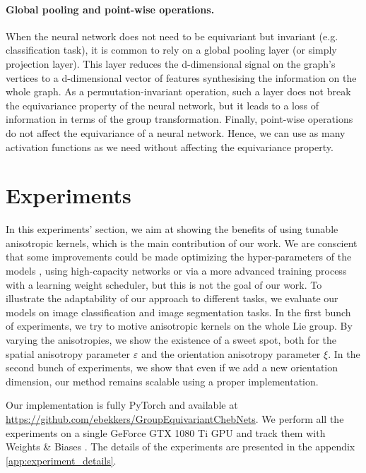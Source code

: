 \documentclass{article}
\begin{document}
\paragraph{Global pooling and point-wise operations.} When the neural network does not need to be equivariant but invariant (e.g. classification task), it is common to rely on a global pooling layer (or simply projection layer). This layer reduces the d-dimensional signal on the graph's vertices to a d-dimensional vector of features synthesising the information on the whole graph. As a permutation-invariant operation, such a layer does not break the equivariance property of the neural network, but it leads to a loss of information in terms of the group transformation. Finally, point-wise operations do not affect the equivariance of a neural network. Hence, we can use as many activation functions as we need without affecting the equivariance property.


\section{Experiments} \label{sec:experiments}

In this experiments' section, we aim at showing the benefits of using tunable anisotropic kernels, which is the main contribution of our work. We are conscient that some improvements could be made optimizing the hyper-parameters of the models \citep{yu2020hyper}, using high-capacity networks or via a more advanced training process with a learning weight scheduler, but this is not the goal of our work. To illustrate the adaptability of our approach to different tasks, we evaluate our models on image classification and image segmentation tasks. In the first bunch of experiments, we try to motive anisotropic kernels on the whole Lie group. By varying the anisotropies, we show the existence of a sweet spot, both for the spatial anisotropy parameter $\varepsilon$ and the orientation anisotropy parameter $\xi$. In the second bunch of experiments, we show that even if we add a new orientation dimension, our method remains scalable using a proper implementation.

Our implementation is fully PyTorch \citep{pytorch} and available at \url{https://github.com/ebekkers/GroupEquivariantChebNets}. We perform all the experiments on a single GeForce GTX 1080 Ti GPU and track them with Weights \& Biases \citep{wandb}. The details of the experiments are presented in the appendix \ref{app:experiment_details}.
\end{document}
